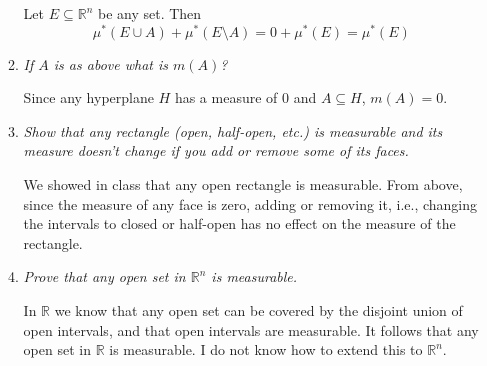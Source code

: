 \documentclass[11pt]{article}
\begin{document}
\begin{enumerate}
\begin{enumerate}
Let $E \subseteq \mathbb{R}^n$ be any set.  Then
\[
\mu^\ast(E \cup A) + \mu^\ast(E \setminus A) = 0 + \mu^\ast(E) = \mu^\ast(E)
\]

\item \emph{If $A$ is as above what is $m(A)$?}

Since any hyperplane $H$ has a measure of $0$ and $A \subseteq H$, $m(A) = 0$.

\item \emph{Show that any rectangle (open, half-open, etc.) is measurable and its measure doesn't change if you add or remove some of its faces.}

We showed in class that any open rectangle is measurable.  From above, since the measure of any face is zero, adding or removing it, i.e., changing the intervals to closed or half-open has no effect on the measure of the rectangle.

\item \emph{Prove that any open set in $\mathbb{R}^n$ is measurable.}

In $\mathbb{R}$ we know that any open set can be covered by the disjoint union of open intervals, and that open intervals are measurable.  It follows that any open set in $\mathbb{R}$ is measurable.  I do not know how to extend this to $\mathbb{R}^n$.
\end{enumerate}
\end{enumerate}
\end{document}

